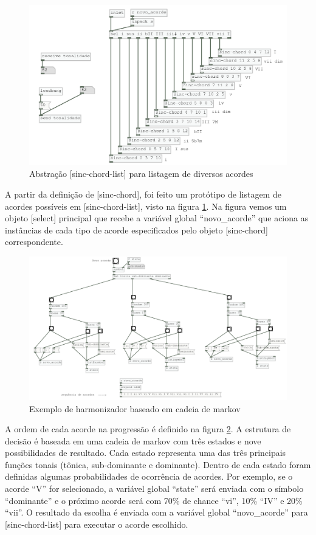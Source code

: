 \documentclass{ppgmus}
\begin{document}
\begin{figure}
\includegraphics[scale=.6]{sinc-chord-list}
\caption{Abstração [sinc-chord-list] para listagem de diversos acordes}
\label{sinc-chord-list}
\end{figure}


A partir da definição de [sinc-chord], foi feito um protótipo de listagem de acordes
possíveis em [sinc-chord-list], visto na figura \ref{sinc-chord-list}. Na figura vemos
um objeto [select] principal que recebe a variável global ``novo\_acorde'' que aciona as instâncias
de cada tipo de acorde especificados pelo objeto [sinc-chord] correspondente.


\begin{figure}
\includegraphics[scale=.6]{harm-markov}
\caption{Exemplo de harmonizador baseado em cadeia de markov}
\label{harm-markov}
\end{figure}

A ordem de cada acorde na progressão é definido na figura \ref{harm-markov}.
A estrutura de decisão é baseada em uma cadeia de markov com três estados e 
nove possibilidades de resultado. Cada estado representa uma das três principais
funções tonais (tônica, sub-dominante e dominante). Dentro de cada estado foram definidas
algumas probabilidades de ocorrência de acordes. Por exemplo, se o acorde ``V'' 
for selecionado, a variável global ``state'' será enviada com o símbolo ``dominante'' e o próximo
acorde será com 70\% de chance ``vi'', 10\% ``IV'' e 20\% ``vii''. O resultado da escolha 
é enviada com a variável global ``novo\_acorde'' para [sinc-chord-list] para executar o
acorde escolhido.
\end{document}
